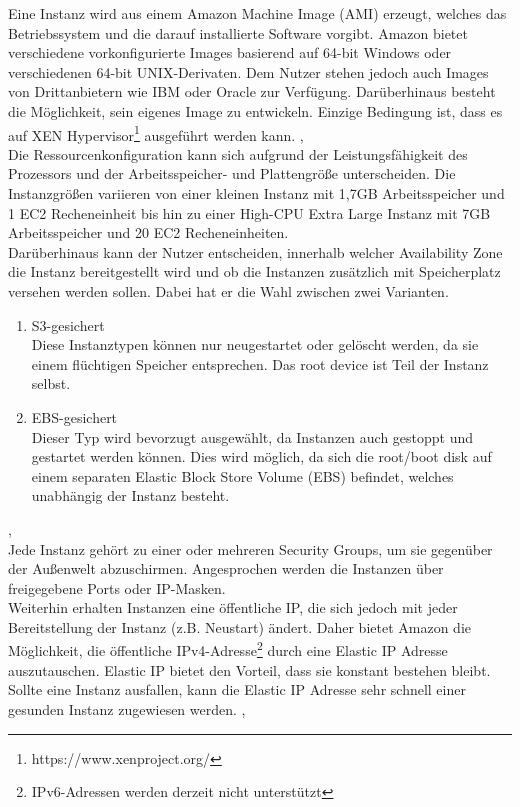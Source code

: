 Eine Instanz wird aus einem Amazon Machine Image (AMI) erzeugt, welches das Betriebssystem und die darauf installierte Software vorgibt. Amazon bietet verschiedene vorkonfigurierte Images basierend auf 64-bit Windows oder verschiedenen 64-bit UNIX-Derivaten. Dem Nutzer stehen jedoch auch Images von Drittanbietern wie IBM oder Oracle zur Verfügung. Darüberhinaus besteht die Möglichkeit, sein eigenes Image zu entwickeln. Einzige Bedingung ist, dass es auf XEN Hypervisor\footnote{https://www.xenproject.org/} ausgeführt werden kann. \cite{baun:cloudcomp}, \cite{vliet:resilience} \\

Die Ressourcenkonfiguration kann sich aufgrund der Leistungsfähigkeit des Prozessors und der Arbeitsspeicher- und Plattengröße unterscheiden. Die Instanzgrößen variieren von einer kleinen Instanz mit 1,7GB Arbeitsspeicher und 1 EC2 Recheneinheit bis hin zu einer High-CPU Extra Large Instanz mit 7GB Arbeitsspeicher und 20 EC2 Recheneinheiten. \cite{vliet:resilience} \\

Darüberhinaus kann der Nutzer entscheiden, innerhalb welcher Availability Zone die Instanz bereitgestellt wird und ob die Instanzen zusätzlich mit Speicherplatz versehen werden sollen. Dabei hat er die Wahl zwischen zwei Varianten.
\begin{enumerate}
  \item S3-gesichert
  \\ Diese Instanztypen können nur neugestartet oder gelöscht werden, da sie einem flüchtigen Speicher entsprechen. Das root device ist Teil der Instanz selbst.
  \item EBS-gesichert
  \\ Dieser Typ wird bevorzugt ausgewählt, da Instanzen auch gestoppt und gestartet werden können. Dies wird möglich, da sich die root/boot disk auf einem separaten Elastic Block Store Volume (EBS) befindet, welches unabhängig der Instanz besteht.
\end{enumerate}
\cite{vliet:resilience}, \cite{aws:ec2} \\

Jede Instanz gehört zu einer oder mehreren Security Groups, um sie gegenüber der Außenwelt abzuschirmen. Angesprochen werden die Instanzen über freigegebene Ports oder IP-Masken.
\\ Weiterhin erhalten Instanzen eine öffentliche IP, die sich jedoch mit jeder Bereitstellung der Instanz (z.B. Neustart) ändert. Daher bietet Amazon die Möglichkeit, die öffentliche IPv4-Adresse\footnote{IPv6-Adressen werden derzeit nicht unterstützt} durch eine Elastic IP Adresse auszutauschen. Elastic IP bietet den Vorteil, dass sie konstant bestehen bleibt. Sollte eine Instanz ausfallen, kann die Elastic IP Adresse sehr schnell einer gesunden Instanz zugewiesen werden.
\cite{vliet:resilience}, \cite{aws:eip} \\

